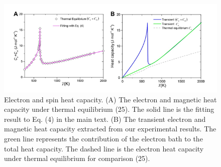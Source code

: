 \begin{figure}[htbp]
	\begin{center}
		\includegraphics[width=150mm]{figs/NiFigS8}
	\end{center}
	\caption{Electron and spin heat capacity. (A) The electron and magnetic heat capacity under thermal equilibrium (25). The solid line is the fitting result to Eq. (4) in the main text. (B) The transient electron and magnetic heat capacity extracted from our experimental results. The green line represents the contribution of the electron bath to the total heat capacity. The dashed line is the electron heat capacity under thermal equilibrium for comparison (25). }
	\label{fig: NiSIfig8}
\end{figure}

